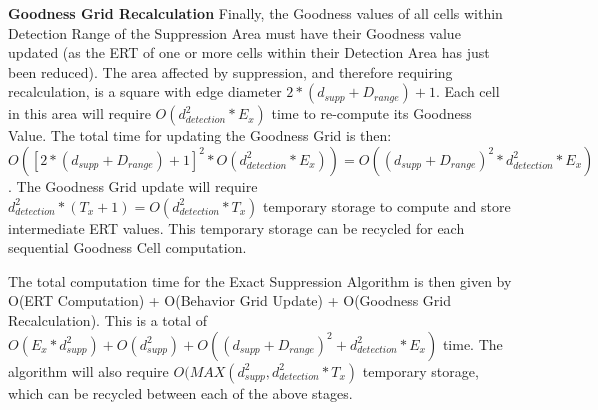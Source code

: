 \textbf{Goodness Grid Recalculation}\newline
Finally, the Goodness values of all cells within Detection Range of the Suppression Area must have their Goodness value updated (as the ERT of one or more cells within their Detection Area has just been reduced).  The area affected by suppression, and therefore requiring recalculation, is a square with edge diameter $2 * (d_{supp} + D_{range}) + 1$.  Each cell in this area will require  $O(d_{detection}^2 * E_x)$ time to re-compute its Goodness Value.  The total time for updating the Goodness Grid is then: $O([2 * (d_{supp} + D_{range}) + 1]^2 * O(d_{detection}^2 * E_x)) = O((d_{supp} + D_{range})^2 * d_{detection}^2 * E_x)$.  The Goodness Grid update will require $d_{detection}^2 * (T_x + 1) = O(d_{detection}^2 * T_x)$ temporary storage to compute and store intermediate ERT values.  This temporary storage can be recycled for each sequential Goodness Cell computation.


The total computation time for the Exact Suppression Algorithm is then given by O(ERT Computation) + O(Behavior Grid Update) + O(Goodness Grid Recalculation). This is a total of $O(E_{x} * d_{supp}^2) + O(d_{supp}^2) + O((d_{supp} + D_{range})^2 + d_{detection}^2 * E_x)$ time.  The algorithm will also require $O(MAX(d_{supp}^2 , d_{detection}^2 * T_x)$ temporary storage, which can be recycled between each of the above stages.
